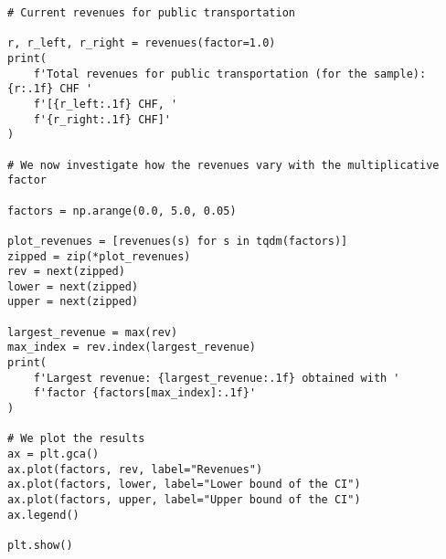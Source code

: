 \documentclass[12pt,a4paper]{article}
\begin{document}
\begin{lstlisting}[style=numbers]
# Current revenues for public transportation

r, r_left, r_right = revenues(factor=1.0)
print(
    f'Total revenues for public transportation (for the sample): {r:.1f} CHF '
    f'[{r_left:.1f} CHF, '
    f'{r_right:.1f} CHF]'
)

# We now investigate how the revenues vary with the multiplicative factor

factors = np.arange(0.0, 5.0, 0.05)

plot_revenues = [revenues(s) for s in tqdm(factors)]
zipped = zip(*plot_revenues)
rev = next(zipped)
lower = next(zipped)
upper = next(zipped)

largest_revenue = max(rev)
max_index = rev.index(largest_revenue)
print(
    f'Largest revenue: {largest_revenue:.1f} obtained with '
    f'factor {factors[max_index]:.1f}'
)

# We plot the results
ax = plt.gca()
ax.plot(factors, rev, label="Revenues")
ax.plot(factors, lower, label="Lower bound of the CI")
ax.plot(factors, upper, label="Upper bound of the CI")
ax.legend()

plt.show()
\end{lstlisting}
\end{document}
